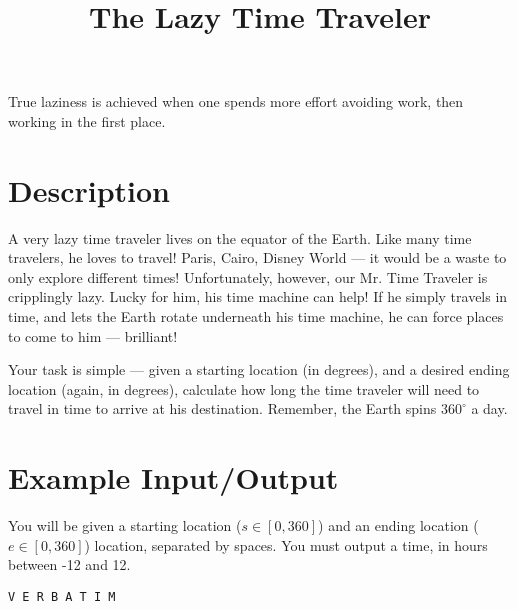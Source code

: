 \documentclass{../codeproblem}
\begin{document}
\title{The Lazy Time Traveler}

\begin{flavor}
  True laziness is achieved when one spends more effort avoiding work,
  then working in the first place.
\end{flavor}

\section*{Description}
A very lazy time traveler lives on the equator of the Earth. Like many
time travelers, he loves to travel! Paris, Cairo, Disney World --- it
would be a waste to only explore different times! Unfortunately,
however, our Mr. Time Traveler is cripplingly lazy. Lucky for him, his
time machine can help! If he simply travels in time, and lets the
Earth rotate underneath his time machine, he can force places to come
to him --- brilliant!

Your task is simple --- given a starting location (in degrees), and a
desired ending location (again, in degrees), calculate how long the
time traveler will need to travel in time to arrive at his
destination. Remember, the Earth spins $360^\circ$ a day.

\section*{Example Input/Output}

You will be given a starting location ($s \in [0, 360]$) and an ending
location ($e \in [0, 360]$) location, separated by spaces. You must
output a time, in hours between -12 and 12.

\begin{example}
\begin{verbatim}
V E R B A T I M
\end{verbatim}
\end{example}
\end{document}
